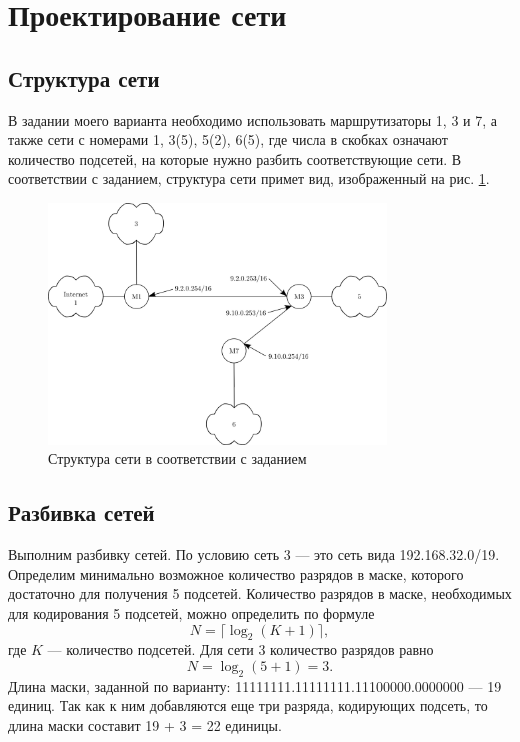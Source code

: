 \documentclass[a4paper, 14pt]{extarticle}
\begin{document}
\section{Проектирование сети}

\subsection{Структура сети}

В задании моего варианта необходимо использовать маршрутизаторы 1, 3 и 7, а
также сети с номерами 1, 3(5), 5(2), 6(5), где числа в скобках означают
количество подсетей, на которые нужно разбить соответствующие сети. В
соответствии с заданием, структура сети примет вид, изображенный на рис.
\ref{fig:network-scheme-1}.

\begin{figure}[H]
  \centering
  \includegraphics[width=0.8\textwidth]{images/network-scheme-1.png}
  \caption{Структура сети в соответствии с заданием}
  \label{fig:network-scheme-1}
\end{figure}

\subsection{Разбивка сетей}

Выполним разбивку сетей. По условию сеть 3 --- это сеть вида 192.168.32.0/19.
Определим минимально возможное количество разрядов в маске, которого достаточно
для получения 5 подсетей. Количество разрядов в маске, необходимых для
кодирования 5 подсетей, можно определить по формуле
\[
  N = \lceil \log_2 (K + 1) \rceil,
\]
где \(K\) --- количество подсетей. Для сети 3 количество разрядов равно
\[
  N = \log_2 (5 + 1) = 3.
\]
Длина маски, заданной по варианту: 11111111.11111111.11100000.0000000 --- 19
единиц. Так как к ним добавляются еще три разряда, кодирующих подсеть, то длина
маски составит 19 + 3 = 22 единицы.
\end{document}
